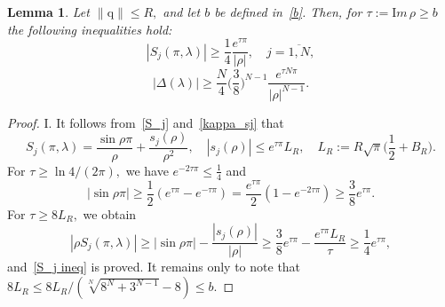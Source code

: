 \documentclass[a4paper, 12pt] {article}
\theoremstyle{plain}
\newtheorem{lemma}{\indent Lemma}
\theoremstyle{remark}
\theoremstyle{plain}
\theoremstyle{definition}
\numberwithin{equation}{section}
\begin{document}
\begin{lemma} \label{b lemma}
Let $\| \mathrm q\| \le R,$ and let
$b$ be defined in~\eqref{b}.
Then, for $\tau := {\mathrm Im}\,\rho \ge b$ the following inequalities hold:
\begin{equation} \label{S_j ineq}
|S_j(\pi, \lambda)| \ge \frac14\frac{e^{\tau \pi}}{|\rho|}, \quad j=\overline{1, N},
\end{equation}
\begin{equation} \label{Delta ineq}
|\Delta(\lambda)| \ge \frac{N}{4} \Big(\frac{3}{8}\Big)^{N-1}\frac{e^{\tau N \pi}}{ |\rho|^{N-1}}.
\end{equation}
\end{lemma}
\begin{proof}
I.  It follows from~\eqref{S_j} and~\eqref{kappa_sj} that
\begin{equation} \label{L_R}
S_j(\pi, \lambda) = \frac{\sin \rho \pi}{\rho} + \frac{s_j(\rho)}{\rho^2}, \quad |s_j(\rho)|\le e^{\tau \pi} L_R, \quad L_R := R \sqrt{\pi}\Big(\frac12 + B_R\Big).
\end{equation}
For $\tau \ge \ln 4/(2 \pi),$ we have $e^{-2\tau \pi} \le \frac14$ and
$$|\sin \rho \pi| \ge \frac12(e^{\tau \pi} - e^{-\tau \pi}) = \frac{e^{\tau \pi}}{2}(1 - e^{-2\tau \pi}) \ge \frac{3}{8}e^{\tau \pi}.$$
For $\tau \ge 8 L_R,$ we obtain
$$|\rho S_j(\pi, \lambda)| \ge |\sin \rho \pi| - \frac{|s_j(\rho)|}{|\rho|} \ge \frac{3}{8}e^{\tau \pi} - \frac{e^{\tau \pi}L_R}{\tau} \ge \frac14e^{\tau \pi},$$
and~\eqref{S_j ineq} is proved. It remains only to note that $8 L_R \le 8L_R /(\sqrt[N]{8^N + 3^{N-1}}-8) \le b.$


\end{proof}
\end{document}
